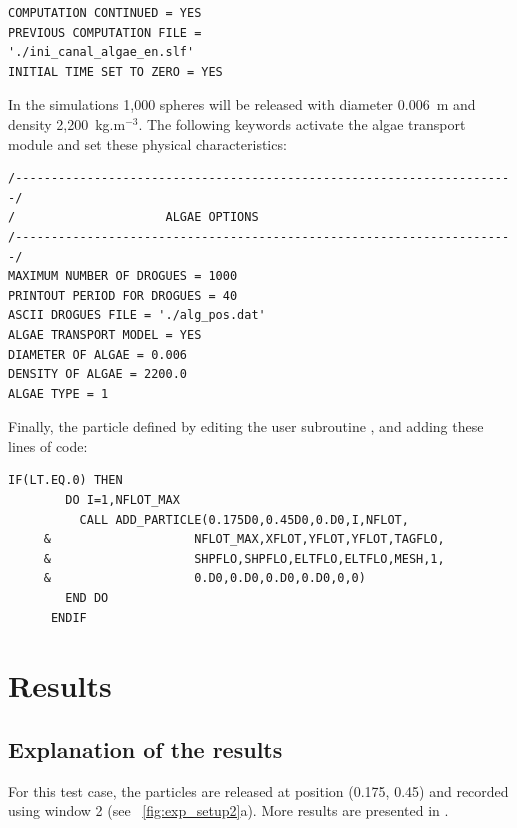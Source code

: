 \lstset{language=TelemacCas,
        basicstyle=\scriptsize\ttfamily}

\begin{lstlisting}[frame=trBL]
COMPUTATION CONTINUED = YES
PREVIOUS COMPUTATION FILE =
'./ini_canal_algae_en.slf'
INITIAL TIME SET TO ZERO = YES
\end{lstlisting}

In the simulations 1,000 spheres will be released with diameter 0.006~m and
density 2,200~kg.m$^{-3}$.
The following keywords activate the algae transport module and set these
physical characteristics:

\lstset{language=TelemacCas,
        basicstyle=\scriptsize\ttfamily}

\begin{lstlisting}[frame=trBL]
/----------------------------------------------------------------------/
/                     ALGAE OPTIONS
/----------------------------------------------------------------------/
MAXIMUM NUMBER OF DROGUES = 1000
PRINTOUT PERIOD FOR DROGUES = 40
ASCII DROGUES FILE = './alg_pos.dat'
ALGAE TRANSPORT MODEL = YES
DIAMETER OF ALGAE = 0.006
DENSITY OF ALGAE = 2200.0
ALGAE TYPE = 1
\end{lstlisting}

Finally, the particle defined by editing the user subroutine
, and adding these lines of code:


\lstset{language=Fortran,
        basicstyle=\scriptsize\ttfamily}

\begin{lstlisting}[frame=trBL]
      IF(LT.EQ.0) THEN
        DO I=1,NFLOT_MAX
          CALL ADD_PARTICLE(0.175D0,0.45D0,0.D0,I,NFLOT,
     &                    NFLOT_MAX,XFLOT,YFLOT,YFLOT,TAGFLO,
     &                    SHPFLO,SHPFLO,ELTFLO,ELTFLO,MESH,1,
     &                    0.D0,0.D0,0.D0,0.D0,0,0)
        END DO
      ENDIF
\end{lstlisting}

\section{Results}

\subsection{Explanation of the results}

For this test case, the particles are released at position (0.175, 0.45) and
recorded using window 2 (see \figurename~\ref{fig:exp_setup2}a).
More results are presented in \citet{Joly2011}.

